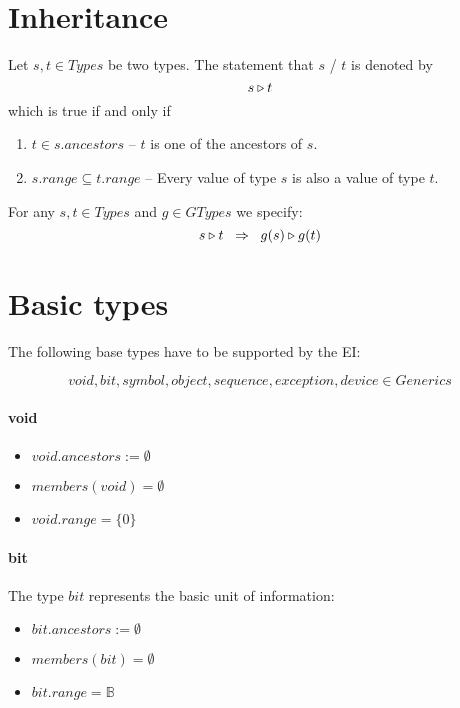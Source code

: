 \section{Inheritance}

Let $s, t \in Types$ be two types. The statement that $s$ / $t$ is denoted by
\[s \triangleright t\]
which is true if and only if
\begin{enumerate}
\item $t \in s.ancestors$ -- $t$ is one of the ancestors of $s$.
\item $s.range \subseteq t.range$ -- Every value of type $s$ is also a value of type $t$.
\end{enumerate}

For any $s, t \in Types$ and $g \in GTypes$ we specify:
\[ s \triangleright t \;\; \Rightarrow \;\; g(s) \triangleright g(t)\]

\section{Basic types}

The following base types have to be supported by the EI:

\[void, bit, symbol, object, sequence, exception, device \in Generics\]

\paragraph{void}

\begin{itemize}
\item $void.ancestors := \emptyset$
\item $members(void) = \emptyset$
\item $void.range = \{ 0 \}$ %
\end{itemize}

\paragraph{bit}

The type $bit$ represents the basic unit of information:

\begin{itemize}
\item $bit.ancestors := \emptyset$
\item $members(bit) = \emptyset$
\item $bit.range = \mathbb{B}$
\end{itemize}

